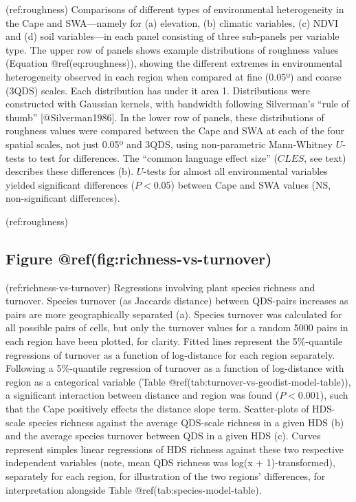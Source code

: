 (ref:roughness) Comparisons of different types of environmental
heterogeneity in the Cape and SWA---namely for (a) elevation, (b)
climatic variables, (c) NDVI and (d) soil variables---in each panel
consisting of three sub-panels per variable type. The upper row of
panels shows example distributions of roughness values (Equation
@ref(eq:roughness)), showing the different extremes in environmental
heterogeneity observed in each region when compared at fine (0.05º) and
coarse (3QDS) scales. Each distribution has under it area 1.
Distributions were constructed with Gaussian kernels, with bandwidth
following Silverman's ``rule of thumb'' {[}@Silverman1986{]}. In the
lower row of panels, these distributions of roughness values were
compared between the Cape and SWA at each of the four spatial scales,
not just 0.05º and 3QDS, using non-parametric Mann-Whitney \(U\)-tests
to test for differences. The ``common language effect size'' (\(CLES\),
see text) describes these differences (b). \(U\)-tests for almost all
environmental variables yielded significant differences (\(P < 0.05\))
between Cape and SWA values (NS, non-significant differences).

(ref:roughness)

\hypertarget{figure-reffigrichness-vs-turnover}{%
\subsection*{Figure
@ref(fig:richness-vs-turnover)}\label{figure-reffigrichness-vs-turnover}}

(ref:richness-vs-turnover) Regressions involving plant species richness
and turnover. Species turnover (as Jaccards distance) between QDS-pairs
increases as pairs are more geographically separated (a). Species
turnover was calculated for all possible pairs of cells, but only the
turnover values for a random 5000 pairs in each region have been
plotted, for clarity. Fitted lines represent the 5\%-quantile
regressions of turnover as a function of log-distance for each region
separately. Following a 5\%-quantile regression of turnover as a
function of log-distance with region as a categorical variable (Table
@ref(tab:turnover-vs-geodist-model-table)), a significant interaction
between distance and region was found (\(P < 0.001\)), such that the
Cape positively effects the distance slope term. Scatter-plots of
HDS-scale species richness against the average QDS-scale richness in a
given HDS (b) and the average species turnover between QDS in a given
HDS (c). Curves represent simples linear regressions of HDS richness
against these two respective independent variables (note, mean QDS
richness was log(x + 1)-transformed), separately for each region, for
illustration of the two regions' differences, for interpretation
alongside Table @ref(tab:species-model-table).

